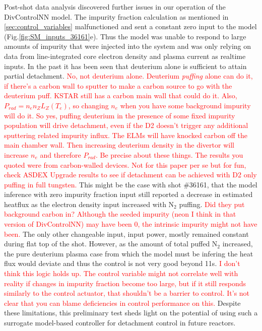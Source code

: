 Post-shot data analysis discovered further issues in our operation of the DivControlNN model.
The impurity fraction calculation as mentioned in \ref{sec:control_variables} malfunctioned and sent a constant zero input to the model (Fig.\ref{fig:SM_inputs_36161}e).
Thus the model was unable to respond to large amounts of impurity that were injected into the system and was only relying on data from line-integrated core electron density and plasma current as realtime inputs.
In the past it has been seen that deuterium alone is sufficient to attain partial detachment\cite{Loarte_1998_NF, Eldon_2017_NF}.
\textcolor{red}{No, not deuterium alone. Deuterium \emph{puffing} alone can do it, if there's a carbon wall to sputter to make a carbon source to go with the deuterium puff. KSTAR still has a carbon main wall that could do it. Also, $P_{rad}=n_e n_Z L_Z(T_e)$, so changing $n_e$ when you have some background impurity will do it. So yes, puffing deuterium in the presence of some fixed impurity population will drive detachment, even if the D2 doesn't trigger any additional sputtering related impurity influx. The ELMs will have knocked carbon off the main chamber wall. Then increasing deuterium density in the divertor will increase $n_e$ and therefore $P_{rad}$. Be precise about these things. The results you quoted were from carbon-walled devices. Not for this paper per se but for fun, check ASDEX Upgrade results to see if detachment can be achieved with D2 only puffing in full tungsten.}
This might be the case with shot \#36161, that the model inference with zero impurity fraction input still reported a decrease in estimated heatflux as the electron density input increased with N$_2$ puffing.
\textcolor{red}{Did they put background carbon in? Although the seeded impurity (neon I think in that version of DivControlNN) may have been 0, the intrinsic impurity might not have been.}
The only other changeable input, input power, mostly remained constant during flat top of the shot.
However, as the amount of total puffed N$_2$ increased, the pure deuterium plasma case from which the model must be infering the heat flux would deviate and thus the control is not very good beyond 11s.
\textcolor{red}{I don't think this logic holds up. The control variable might not correlate well with reality if changes in impurity fraction become too large, but if it still responds similarly to the control actuator, that shouldn't be a barrier to control. It's not clear that you can blame deficiencies in control performance on this.}
Despite these limitations, this preliminary test sheds light on the potential of using such a surrogate model-based controller for detachment control in future reactors.
